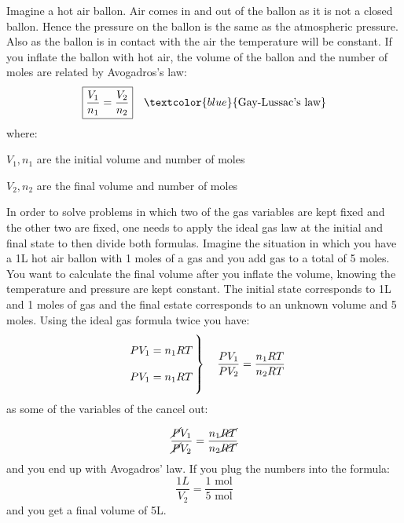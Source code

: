 \documentclass[main.tex]{subfiles}
\begin{document}
\begin{description}
\begin{marginfigure}[0cm]
\caption{An hot air ballon will rise up as air's density decreases with temperature}
\end{marginfigure}%

\item[\docfilehook{Volume-Moles change}{Volume-Moles change}] 
Imagine a hot air ballon. Air comes in and out of the ballon as it is not a closed ballon. Hence the pressure on the ballon is the same as the atmospheric pressure. Also as the ballon is in contact with the air the temperature will be constant. If you inflate the ballon with hot air, the volume of the ballon and the number of moles are related by Avogadros's law:
\begin{equation*}
\boxed{  \frac{V_1} {n_1}=\frac{V_2} {n_2}} \quad \textcolor{blue}{\text{Gay-Lussac's law}}
\end{equation*}
where:
\begin{where}
 \item $V_1, n_1$   are the initial volume and number of moles
 \item $V_2, n_2$   are the final volume and number of moles
\end{where}

In order to solve problems in which two of the gas variables are kept fixed and the other two are fixed, one needs to apply the ideal gas law at the initial and final state to then divide both formulas. Imagine the situation in which you have a 1L hot air ballon with 1 moles of a gas and you add gas to a total of 5 moles. You want to calculate the final volume after you inflate the volume, knowing the temperature and pressure are kept constant. The initial state corresponds to 1L and 1 moles of gas and the  final estate corresponds to an unknown volume and 5 moles. Using the ideal gas formula twice you have:
\begin{equation}
  \left.
  \raisebox{0pt}[30pt]{\smash{$\begin{array}{r@{}l@{\,}l}
   &  PV_1=n_1RT \\
   \\ 
    & PV_1=n_1RT \\
  \end{array}$}}
  \right\} \quad \frac{PV_1}{PV_2}=\frac{n_1RT}{n_2RT} 
\end{equation}
as some of the variables of the cancel out:

\begin{equation}
\frac{\cancel{P}V_1}{\cancel{P}V_2}=\frac{n_1\cancel{RT}}{n_2\cancel{RT}} 
\end{equation}
and you end up with Avogadros' law. If you plug the numbers into the formula:
\begin{equation}
\frac{1L}{V_2}=\frac{1 \text{ mol}}{5 \text{ mol}} 
\end{equation}
and you get a final volume of 5L.


\end{description}
\end{document}
